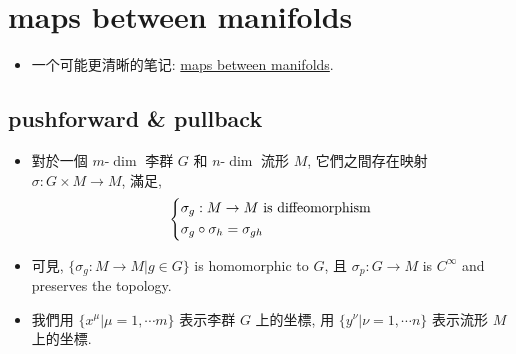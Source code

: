 \chapter{maps between manifolds} \label{B}
\begin{itemize}
	\item 一个可能更清晰的笔记: \href{https://github.com/siyang03/my-note---maps-between-manifolds}{maps between manifolds}.
\end{itemize}

\section{pushforward \& pullback}
\begin{itemize}
	\item 對於一個 $m\text{-}\dim$ 李群 $G$ 和 $n\text{-}\dim$ 流形 $M$, 它們之間存在映射 $\sigma : G \times M \rightarrow M$, 滿足,
	\begin{equation}
		\begin{dcases}
			\sigma_g : M \rightarrow M \text{ is diffeomorphism} \\
			\sigma_g \circ \sigma_h = \sigma_{g h}
		\end{dcases}
	\end{equation}
	
	\item 可見, $\{ \sigma_g : M \rightarrow M | g \in G \}$ is homomorphic to $G$, 且 $\sigma_p : G \rightarrow M$ is $C^\infty$ and preserves the topology.
	
	\item 我們用 $\{ x^\mu | \mu = 1,\cdots m \}$ 表示李群 $G$ 上的坐標, 用 $\{ y^\nu | \nu = 1,\cdots n \}$ 表示流形 $M$ 上的坐標.
\end{itemize}

